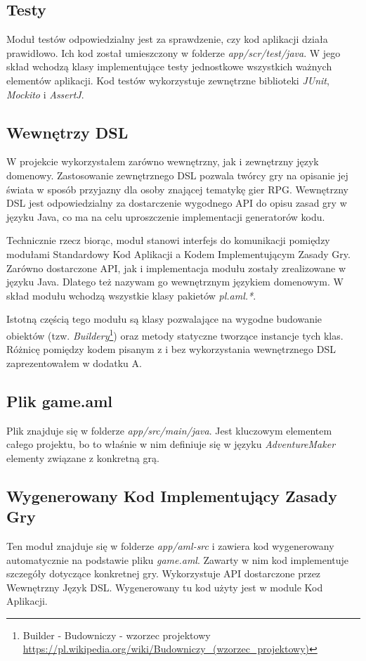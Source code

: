 \documentclass[openright]{xmgr}
\begin{document}
\subsection*{Testy}
Moduł testów odpowiedzialny jest za sprawdzenie, czy kod aplikacji działa prawidłowo. Ich  kod został umieszczony w folderze \textit{app/scr/test/java}. W jego skład wchodzą klasy implementujące testy jednostkowe wszystkich ważnych elementów aplikacji. Kod testów wykorzystuje zewnętrzne biblioteki \textit{JUnit}, \textit{Mockito} i \textit{AssertJ}.

\subsection*{Wewnętrzy DSL}

W projekcie wykorzystałem zarówno wewnętrzny, jak i zewnętrzny język domenowy. Zastosowanie zewnętrznego DSL pozwala twórcy gry na opisanie jej świata w sposób przyjazny dla osoby znającej tematykę gier RPG.  Wewnętrzny DSL jest odpowiedzialny za dostarczenie wygodnego API do opisu zasad gry w języku Java, co ma na celu uproszczenie implementacji generatorów kodu.

Technicznie rzecz biorąc, moduł stanowi interfejs do komunikacji pomiędzy modułami Standardowy Kod Aplikacji a Kodem Implementującym Zasady Gry. Zarówno dostarczone API, jak i implementacja modułu zostały zrealizowane w języku Java. Dlatego też nazywam go wewnętrznym językiem domenowym. W skład modułu wchodzą wszystkie klasy pakietów \textit{pl.aml.*}.

Istotną częścią tego modułu są klasy pozwalające na wygodne budowanie obiektów (tzw. \textit{Buildery}\footnote{Builder - Budowniczy  - wzorzec projektowy  \url{https://pl.wikipedia.org/wiki/Budowniczy_(wzorzec_projektowy)}}) oraz metody statyczne tworzące instancje tych klas. Różnicę pomiędzy kodem pisanym z i bez wykorzystania wewnętrznego DSL zaprezentowałem w dodatku A.

\subsection*{Plik game.aml}
Plik znajduje się w folderze \textit{app/src/main/java}. Jest kluczowym elementem całego projektu, bo to właśnie w nim definiuje się w języku \textit{AdventureMaker} elementy związane z konkretną grą.

\subsection*{Wygenerowany Kod Implementujący Zasady Gry}
Ten moduł znajduje się w folderze \textit{app/aml-src} i zawiera kod wygenerowany automatycznie na podstawie pliku \textit{game.aml}. Zawarty w nim kod implementuje szczegóły dotyczące konkretnej gry. Wykorzystuje API dostarczone przez Wewnętrzny Język DSL. Wygenerowany tu kod użyty jest w module Kod Aplikacji.
\end{document}
